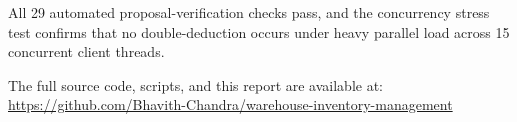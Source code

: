 \documentclass[12pt,a4paper]{article}
\begin{document}
All 29 automated proposal-verification checks pass, and the concurrency stress test
confirms that no double-deduction occurs under heavy parallel load across 15
concurrent client threads.

The full source code, scripts, and this report are available at:\\[4pt]
\url{https://github.com/Bhavith-Chandra/warehouse-inventory-management}
\end{document}
